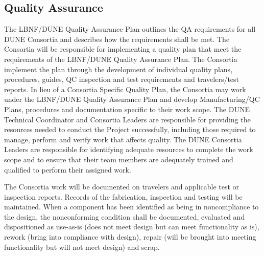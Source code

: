 \subsection{Quality Assurance}
\label{sec:fdsp-coord-qa}


The LBNF/DUNE Quality Assurance Plan outlines the QA requirements for
all DUNE Consortia and describes how the requirements shall be
met. The Consortia will be responsible for implementing a quality plan
that meet the requirements of the LBNF/DUNE Quality Assurance Plan.
The Consortia implement the plan through the development of individual
quality plans, procedures, guides, QC inspection and test requirements
and travelers/test reports.  In lieu of a Consortia Specific Quality
Plan, the Consortia may work under the LBNF/DUNE Quality Assurance
Plan and develop Manufacturing/QC Plans, procedures and documentation
specific to their work scope.  The DUNE Technical Coordinator and
Consortia Leaders are responsible for providing the resources needed
to conduct the Project successfully, including those required to
manage, perform and verify work that affects quality.  The DUNE
Consortia Leaders are responsible for identifying adequate resources
to complete the work scope and to ensure that their team members are
adequately trained and qualified to perform their assigned work.

The Consortia work will be documented on travelers and applicable test
or inspection reports. Records of the fabrication, inspection and
testing will be maintained. When a component has been identified as
being in noncompliance to the design, the nonconforming condition
shall be documented, evaluated and dispositioned as use-as-is (does
not meet design but can meet functionality as is), rework (bring into
compliance with design), repair (will be brought into meeting
functionality but will not meet design) and scrap.

